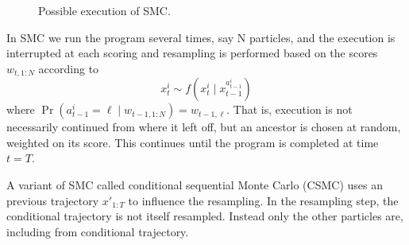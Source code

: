 \begin{figure}[h]
\begin{center}
\end{center}
\caption{Possible execution of SMC.}
\label{fig:smc}
\end{figure}

In SMC we run the program several times, say N particles, and the execution is interrupted at each scoring and resampling is performed based on the scores $w_{t,1:N}$ according to
\begin{equation}
    x_t^i \sim f(x_t^i \mid x_{t-1}^{a_{t-1}^i})
\end{equation}
where $\Pr(a_{t-1}^i = \ell \mid w_{t-1,1:N}) = w_{t-1,\ell}$. That is, execution is not necessarily continued from where it left off, but an ancestor is chosen at random, weighted on its score. This continues until the program is completed at time $t=T$.

A variant of SMC called conditional sequential Monte Carlo (CSMC) uses an previous trajectory $x'_{1:T}$ to influence the resampling. In the resampling step, the conditional trajectory is not itself resampled. Instead only the other particles are, including from conditional trajectory.

